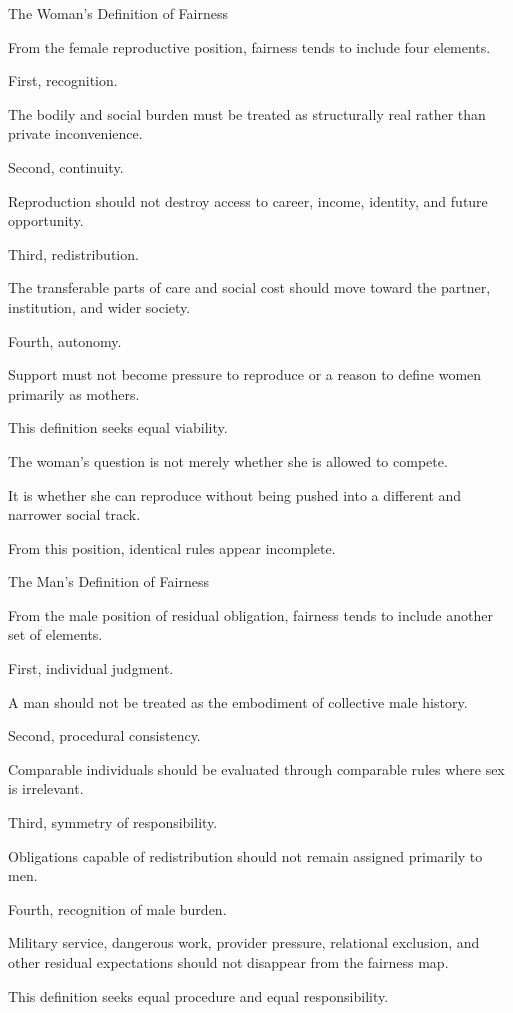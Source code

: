 The Woman’s Definition of Fairness

From the female reproductive position, fairness tends to include four elements.

First, recognition.

The bodily and social burden must be treated as structurally real rather than private inconvenience.

Second, continuity.

Reproduction should not destroy access to career, income, identity, and future opportunity.

Third, redistribution.

The transferable parts of care and social cost should move toward the partner, institution, and wider society.

Fourth, autonomy.

Support must not become pressure to reproduce or a reason to define women primarily as mothers.

This definition seeks equal viability.

The woman’s question is not merely whether she is allowed to compete.

It is whether she can reproduce without being pushed into a different and narrower social track.

From this position, identical rules appear incomplete.

The Man’s Definition of Fairness

From the male position of residual obligation, fairness tends to include another set of elements.

First, individual judgment.

A man should not be treated as the embodiment of collective male history.

Second, procedural consistency.

Comparable individuals should be evaluated through comparable rules where sex is irrelevant.

Third, symmetry of responsibility.

Obligations capable of redistribution should not remain assigned primarily to men.

Fourth, recognition of male burden.

Military service, dangerous work, provider pressure, relational exclusion, and other residual expectations should not disappear from the fairness map.

This definition seeks equal procedure and equal responsibility.

